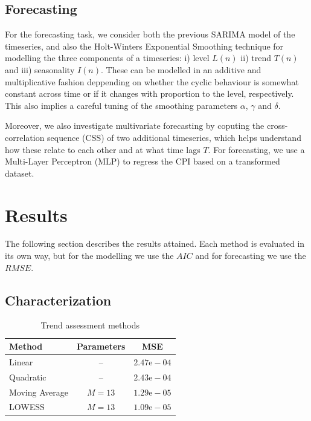 \documentclass[conference]{IEEEtran}
\begin{document}
\subsection{Forecasting}
For the forecasting task, we consider both the previous SARIMA model of the timeseries, and also the Holt-Winters Exponential Smoothing technique for modelling the three components of a timeseries: i) level  $L(n)$ ii) trend $T(n)$ and iii) seasonality $I(n)$. These can be modelled in an additive and multiplicative fashion deppending on whether the cyclic behaviour is somewhat constant across time or if it changes with proportion to the level, respectively. This also implies a careful tuning of the smoothing parameters $\alpha$, $\gamma$ and $\delta$.

Moreover, we also investigate multivariate forecasting by coputing the cross-correlation sequence (CSS) of two additional timeseries, which helps understand how these relate to each other and at what time lags $T$. For forecasting, we use a Multi-Layer Perceptron (MLP) to regress the CPI based on a transformed dataset.

\section{Results}
The following section describes the results attained. Each method is evaluated in its own way, but for the modelling we use the $AIC$ and for forecasting we use the $RMSE$.
\subsection{Characterization}\label{sec:characterization}

\begin{table}[btp]
    \caption{Trend assessment methods}
    \centering
    \begin{tabular}{l|c|c}
         Method & Parameters & MSE \\
         \hline
         Linear & -- &  $2.47\text{e}-04$ \\
         Quadratic & -- & $2.43\text{e}-04$ \\
         Moving Average & $M=13$ & $1.29\text{e}-05$ \\
         LOWESS & $M=13$ & \cellcolor{green!25}$1.09\text{e}-05$ \\
    \end{tabular}
    \label{tab:trend}
\end{table}
\end{document}
